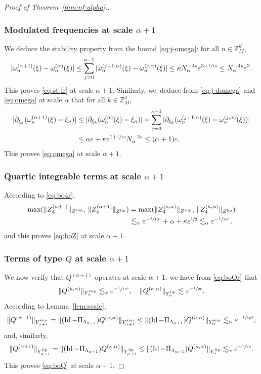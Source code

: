 \documentclass[JEP,XML,SOM,Unicode,published]{cedram}
\theoremstyle{plain}
\theoremstyle{definition}
\newcommand{\Z}{\mathbb{Z}}
\newcommand{\1}{\mathbf{1}}
\newcommand{\Ysup}[1]{Y_{#1}^{\mathrm{sup}}}
\newcommand{\Ylip}[1]{Y_{#1}^{\mathrm{lip}}}
\let\epsilon\varepsilon
\begin{document}
\begin{proof}[Proof of Theorem~\ref{thm:nf-alpha}:]
\subsubsection*{Modulated frequencies at scale $\alpha+1$} We deduce the stability property from the bound \eqref{eq:j-omega}: for all $n\in\Z_{M}^{d}$,
\[
|\omega_{n}^{(\alpha+1)}(\xi)-\omega_{n}^{(\alpha)}(\xi)|
\leq \sum_{j=0}^{\kappa-1}
|\omega_{n}^{(j+1,\alpha)}(\xi) - \omega_{n}^{(j,\alpha)}(\xi)|
\leq \kappa N_{\alpha}^{-4s}\epsilon^{3+\sfrac{1}{10}}
\leq N_{\alpha}^{-4s}\epsilon^{3}.
\]
This proves \eqref{eq:st-fr} at scale $\alpha+1$. Similarly, we~deduce from \eqref{eq:j-domega} and \eqref{eq:omega} at scale $\alpha$ that for all $k\in\Z_{M}^{d}$,
\begin{align*}
|\partial_{\xi_{k}}(\omega_{n}^{(\alpha+1)}(\xi)-\xi_{n})|
&\leq |\partial_{\xi_{k}}(\omega_{n}^{(\alpha)}(\xi)-\xi_{n})|
+
\sum_{j=0}^{\kappa-1}
|\partial_{\xi_{k}}(\omega_{n}^{(j+1,\alpha)}(\xi)-\omega_{n}^{(j,\alpha)}(\xi))| \\
&\leq \alpha\epsilon + \kappa\epsilon^{1+\sfrac{1}{10}}N_{\alpha}^{-2s}
\leq (\alpha+1)\epsilon.
\end{align*}
This proves \eqref{eq:omega} at scale $\alpha+1$.

\subsubsection*{Quartic integrable terms at scale $\alpha+1$} According to \eqref{eq:bo4r},
\begin{align*}
\max(\|Z_{4}^{(\alpha+1)}\|_{Z^{\mathrm{sup}}},\,
\|Z_{4}^{(\alpha+1)}\|_{Z^{\mathrm{lip}}}
)
&=\max(\|Z_{4}^{(\kappa,\alpha)}\|_{Z^{\mathrm{sup}}},\,
\|Z_{4}^{(\kappa,\alpha)}\|_{Z^{\mathrm{lip}}}
)\\
&\lesssim_{\alpha}\epsilon^{-\sfrac{1}{10^{4}}} + \alpha+\kappa\epsilon^{\sfrac{1}{2}}
\lesssim_{\alpha}\epsilon^{-\sfrac{1}{10^{4}}},
\end{align*}
and this proves \eqref{eq:boZ} at scale $\alpha+1$.

\subsubsection*{Terms of type $Q$ at scale $\alpha+1$} We now verify that $Q^{(\alpha+1)}$ operates at scale $\alpha+1$: we have from \eqref{eq:boQr} that
\[
\|Q^{(\kappa,\alpha)}\|_{\Ysup{\alpha}} \lesssim_{\alpha} \epsilon^{-\sfrac{1}{10^{4}}},
\quad
\|Q^{(\kappa,\alpha)}\|_{\Ylip{\alpha}}
\lesssim
\epsilon^{-\sfrac{1}{20}}.
\]
According to Lemma~\ref{lem:scale},
\[
\|Q^{(\alpha+1)}\|_{\Ysup{\alpha+1}}=
\|
(\operatorname{Id}-\Pi_{\Lambda_{\alpha+1}})
Q^{(\kappa,\alpha)}
\|_{\Ysup{\alpha+1}}
\leq
\|
(\operatorname{Id}-\Pi_{\Lambda_{\alpha+1}})Q^{(\kappa,\alpha)}
\|_{\Ysup{\alpha}}
\lesssim_{\alpha}\epsilon^{-\sfrac{1}{10^{4}}},
\]
and, similarly,
\[
\|Q^{(\alpha+1)}\|_{\Ylip{\alpha+1}}=
\|
(\operatorname{Id}-\Pi_{\Lambda_{\alpha+1}})
Q^{(\kappa,\alpha)}
\|_{\Ylip{\alpha+1}}
\leq
\|
(\operatorname{Id}-\Pi_{\Lambda_{\alpha+1}})Q^{(\kappa,\alpha)}
\|_{\Ylip{\alpha}}
\lesssim_{\alpha}\epsilon^{-\sfrac{1}{20}}.
\]
This proves \eqref{eq:boQ} at scale $\alpha+1$.


\end{proof}
\end{document}
